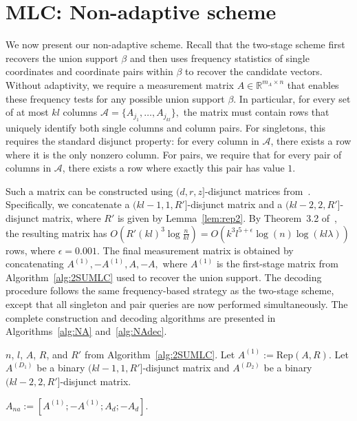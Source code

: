 \documentclass{article}
\begin{document}
\section{MLC: Non-adaptive scheme}\label{sec:1SMLC}
We now present our non-adaptive scheme. Recall that the two-stage scheme first recovers the union support $\beta$ and then uses frequency statistics of single coordinates and coordinate pairs within $\beta$ to recover the candidate vectors. Without adaptivity, we require a measurement matrix $A\in\mathbb{R}^{m_A\times n}$ that enables these frequency tests for any possible union support $\beta$. In particular, for every set of at most $kl$ columns
\(
\mathcal A=\{A_{j_1},\ldots,A_{j_{kl}}\},
\)
the matrix must contain rows that uniquely identify both single columns and column pairs. For singletons, this requires the standard disjunct property: for every column in $\mathcal A$, there exists a row where it is the only nonzero column. For pairs, we require that for every pair of columns in $\mathcal A$, there exists a row where exactly this pair has value $1$.

Such a matrix can be constructed using $(d,r,z]$-disjunct matrices from~\cite{chen2008upper}. Specifically, we concatenate a $(kl-1,1,R']$-disjunct matrix and a $(kl-2,2,R']$-disjunct matrix, where $R'$ is given by Lemma~\ref{lem:rep2}. By Theorem~3.2 of~\cite{chen2008upper}, the resulting matrix has
\(
O\!\left(R'(kl)^3\log\frac{n}{kl}\right)
=
O\!\left(k^3l^{5+\epsilon}\log(n)\log(kl\lambda)\right)
\)
rows, where $\epsilon=0.001$. The final measurement matrix is obtained by concatenating
\(
A^{(1)},-A^{(1)},A,-A,
\)
where $A^{(1)}$ is the first-stage matrix from Algorithm~\ref{alg:2SUMLC} used to recover the union support. The decoding procedure follows the same frequency-based strategy as the two-stage scheme, except that all singleton and pair queries are now performed simultaneously. The complete construction and decoding algorithms are presented in Algorithms~\ref{alg:NA} and~\ref{alg:NAdec}.


\begin{algorithm}
\caption{Non-adaptive scheme of the MLC under Assumption~\ref{Assumption1}: Measurement matrix}\label{alg:NA}
\begin{algorithmic}[1]
    \Require $n$, $l$, $A$, $R$, and $R'$ from Algorithm~\ref{alg:2SUMLC}.
    \State Let $A^{(1)}:=\mathrm{Rep}(A,R)$. Let $A^{(D_1)}$ be a binary $(kl-1,1,R']$-disjunct matrix \cite{chen2008upper} and $A^{(D_2)}$ be a binary $(kl-2,2,R']$-disjunct matrix.
    
    \State \Return $A_{na}:=[A^{(1)};-A^{(1)};A_d;-A_d]$.

\end{algorithmic}
\end{algorithm}
\end{document}
